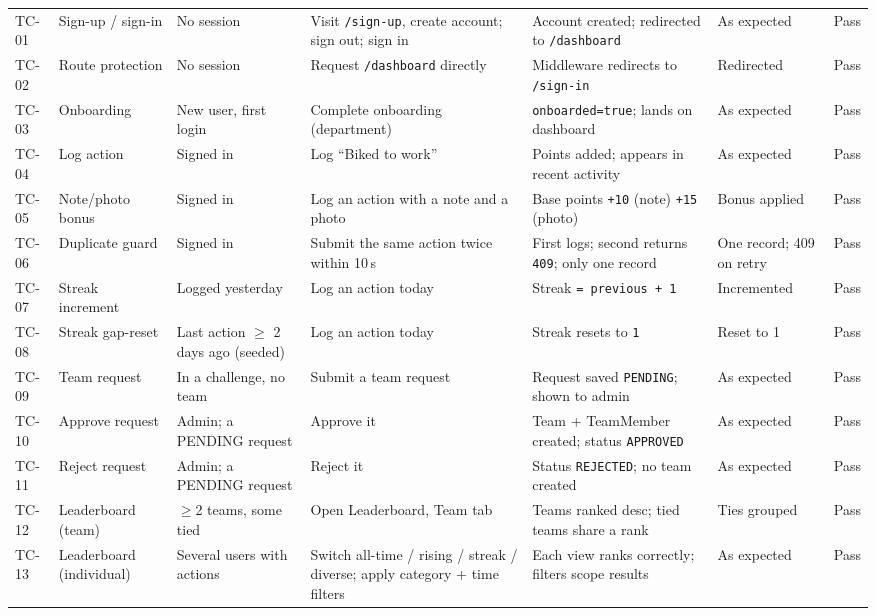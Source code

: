 \documentclass[11pt]{article}
\begin{document}
{\begin{longtable}{p{0.7cm} p{1.9cm} p{2.2cm} p{3.7cm} p{3.0cm} p{1.9cm} p{0.8cm}}
TC-01 & Sign-up / sign-in & No session & Visit \texttt{/sign-up}, create
account; sign out; sign in & Account created; redirected to
\texttt{/dashboard} & As expected & Pass \\
\addlinespace
TC-02 & Route protection & No session & Request \texttt{/dashboard} directly &
Middleware redirects to \texttt{/sign-in} & Redirected & Pass \\
\addlinespace
TC-03 & Onboarding & New user, first login & Complete onboarding (department)
& \texttt{onboarded=true}; lands on dashboard & As expected & Pass \\
\addlinespace
TC-04 & Log action & Signed in & Log ``Biked to work'' & Points added; appears
in recent activity & As expected & Pass \\
\addlinespace
TC-05 & Note/photo bonus & Signed in & Log an action with a note and a photo &
Base points \texttt{+10} (note) \texttt{+15} (photo) & Bonus applied & Pass \\
\addlinespace
TC-06 & Duplicate guard & Signed in & Submit the same action twice within
10\,s & First logs; second returns \texttt{409}; only one record & One record;
409 on retry & Pass \\
\addlinespace
TC-07 & Streak increment & Logged yesterday & Log an action today & Streak
\texttt{= previous + 1} & Incremented & Pass \\
\addlinespace
TC-08 & Streak gap-reset & Last action $\geq$ 2 days ago (seeded) & Log an
action today & Streak resets to \texttt{1} & Reset to 1 & Pass \\
\addlinespace
TC-09 & Team request & In a challenge, no team & Submit a team request & Request
saved \texttt{PENDING}; shown to admin & As expected & Pass \\
\addlinespace
TC-10 & Approve request & Admin; a PENDING request & Approve it & Team +
TeamMember created; status \texttt{APPROVED} & As expected & Pass \\
\addlinespace
TC-11 & Reject request & Admin; a PENDING request & Reject it & Status
\texttt{REJECTED}; no team created & As expected & Pass \\
\addlinespace
TC-12 & Leaderboard (team) & $\geq$2 teams, some tied & Open Leaderboard, Team
tab & Teams ranked desc; tied teams share a rank & Ties grouped & Pass \\
\addlinespace
TC-13 & Leaderboard (individual) & Several users with actions & Switch
all-time / rising / streak / diverse; apply category + time filters & Each view
ranks correctly; filters scope results & As expected & Pass \\

\end{longtable}}
\end{document}
